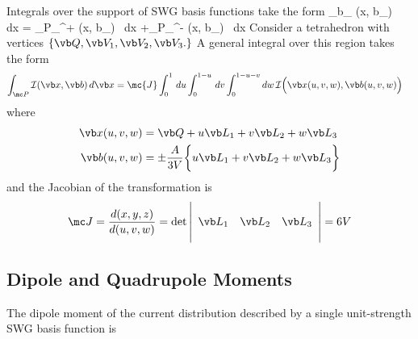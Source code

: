 \documentclass[letterpaper]{article}
\begin{document}
Integrals over the support of SWG basis functions take the form
{
 \int_{\sup \vb b_\alpha} (\vb x, \vb b_\alpha) \, d\vb x
= 
  \int_{\mc P_\alpha^+} (\vb x, \vb b_\alpha) \, d\vb x
 +\int_{\mc P_\alpha^-} (\vb x, \vb b_\alpha) \, d\vb x
}
Consider a tetrahedron with vertices 
$\{\vb Q, \vb V_1, \vb V_2, \vb V_3.\}$ 
A general
integral over this region takes the form
\begin{align*}
 \int_{\mc P} \mathcal{I}(\vb x, \vb b ) \, d\vb x
&=\mc{J} \int_0^1 \, du \int_0^{1-u} \, dv \int_0^{1-u-v} dw \,
  \mathcal{I}\Big( \vb x(u,v,w), \vb b(u,v,w) \Big)
\end{align*}
where
\begin{align*}
 \vb x(u,v,w) 
&= 
 \vb Q + u\vb L_1 + v\vb L_2 + w\vb L_3 
\\
 \vb b(u,v,w) 
&= 
 \pm \frac{A}{3V}\bigg\{ u \vb L_1 
                        +v \vb L_2 
                        +w \vb L_3 
                 \bigg\}
\end{align*}
and the Jacobian of the transformation is 
$$\mc J=\frac{d(x,y,z)}{d(u,v,w)}
   =\det\left|\begin{array}{ccc} 
     \\
     \vb L_1 & \vb L_2 & \vb L_3 \\
     \\
     \end{array}\right|
  =6V
$$

\subsection*{Dipole and Quadrupole Moments}

The dipole moment of the current distribution described by
a single unit-strength SWG basis function is 
\end{document}
